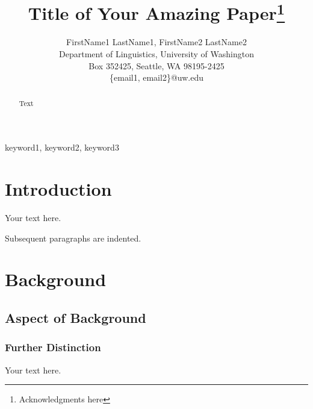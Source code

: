 \documentclass[biblatex, linguex]{uwwpl}
\title{Title of Your Amazing Paper\thanks{Acknowledgments here}}
\author{%
    FirstName1 LastName1, FirstName2 LastName2 
    \\\vspace{1em}
    Department of Linguistics, University of Washington
    \\
    Box 352425, Seattle, WA 98195-2425
    \\
    \{email1, email2\}@uw.edu
}
\begin{document}
\maketitle

\begin{abstract}
    Text
\end{abstract}

\begin{keywords}
    keyword1, keyword2, keyword3
\end{keywords}

\section{Introduction}

Your text here.

Subsequent paragraphs are indented.


\section{Background}

\subsection{Aspect of Background}

\subsubsection{Further Distinction}

Your text here.


\printbibliography
\end{document}
